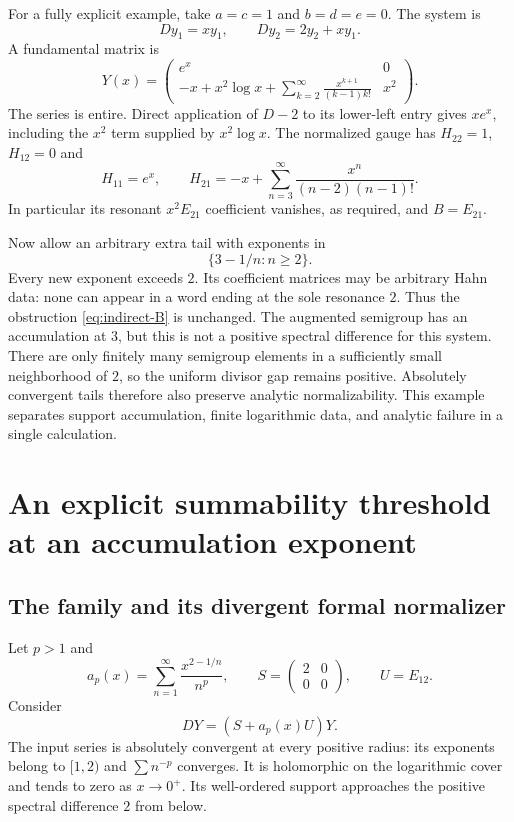 \documentclass[11pt,a4paper]{article}
\numberwithin{equation}{section}
\theoremstyle{definition}
\theoremstyle{remark}
\begin{document}
For a fully explicit example, take $a=c=1$ and $b=d=e=0$. The system is
\begin{equation}\label{eq:indirect-concrete}
 Dy_1=xy_1,\qquad Dy_2=2y_2+xy_1.
\end{equation}
A fundamental matrix is
\begin{equation}\label{eq:indirect-Y}
 Y(x)=
 \begin{pmatrix}
 e^x&0\\[2pt]
 \displaystyle -x+x^2\log x+
    \sum_{k=2}^{\infty}\frac{x^{k+1}}{(k-1)k!}&x^2
 \end{pmatrix}.
\end{equation}
The series is entire. Direct application of $D-2$ to its lower-left entry
gives $xe^x$, including the $x^2$ term supplied by $x^2\log x$.
The normalized gauge has $H_{22}=1$, $H_{12}=0$ and
\[
 H_{11}=e^x,\qquad
 H_{21}=-x+\sum_{n=3}^{\infty}\frac{x^n}{(n-2)(n-1)!}.
\]
In particular its resonant $x^2E_{21}$ coefficient vanishes, as required,
and $B=E_{21}$.

Now allow an arbitrary extra tail with exponents in
\[
 \{3-1/n:n\geq2\}.
\]
Every new exponent exceeds $2$. Its coefficient matrices may be arbitrary
Hahn data: none can appear in a word ending at the sole resonance $2$.
Thus the obstruction \eqref{eq:indirect-B} is unchanged. The augmented
semigroup has an accumulation at $3$, but this is not a positive spectral
difference for this system. There are only finitely many semigroup elements
in a sufficiently small neighborhood of $2$, so the uniform divisor gap
remains positive. Absolutely convergent tails therefore also preserve
analytic normalizability. This example separates support accumulation,
finite logarithmic data, and analytic failure in a single calculation.

\section{An explicit summability threshold at an accumulation exponent}
\label{sec:model}

\subsection{The family and its divergent formal normalizer}
Let $p>1$ and
\begin{equation}\label{eq:ap}
 a_p(x)=\sum_{n=1}^{\infty}\frac{x^{2-1/n}}{n^p},\qquad
 S=\begin{pmatrix}2&0\\0&0\end{pmatrix},\qquad U=E_{12}.
\end{equation}
Consider
\begin{equation}\label{eq:p-system}
 DY=(S+a_p(x)U)Y.
\end{equation}
The input series is absolutely convergent at every positive radius:
its exponents belong to $[1,2)$ and $\sum n^{-p}$ converges. It is
holomorphic on the logarithmic cover and tends to zero as $x\to0^+$.
Its well-ordered support approaches the positive spectral difference $2$
from below.
\end{document}
